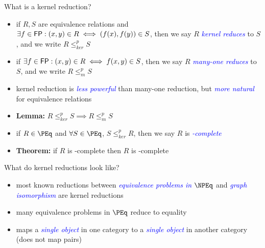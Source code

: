 \documentclass[final]{beamer}
\newcommand{\emphblue}[1]{\emph{\textcolor{blue}{#1}}}
\newcommand{\kr}{\leq_{ker}^p}
\newcommand{\mor}{\leq_{m}^p}
\begin{document}
\begin{frame}{}
\begin{columns}[t]
    \begin{column}{.3\linewidth}
      \begin{block}{\LARGE What is a kernel reduction?}
        \begin{itemize}\Large
        \item if $R,S$ are equivalence relations and $\exists f\in{\ensuremath{\mathsf{FP}}}: (x,y)\in
          R\iff(f(x),f(y))\in S$, then we say $R$ \emphblue{kernel reduces} to
          $S$, and we write $R\kr S$
        \item if $\exists f\in{\ensuremath{\mathsf{FP}}}: (x,y)\in R\iff f(x,y)\in S$, then we say $R$
          \emphblue{many-one reduces} to $S$, and we write $R\mor S$
        \item kernel reduction is \emphblue{less powerful} than many-one
          reduction, but \emphblue{more natural} for equivalence relations
        \item \textbf{Lemma:} $R\kr S\implies R\mor S$
        \item if $R\in\PEq$ and $\forall S\in\PEq$, $S\kr R$, then we say $R$
          is \emphblue{\PEq-complete}
        \item \textbf{Theorem:} if $R$ is \NPEq-complete then $R$ is
          \NP-complete
        \end{itemize}
      \end{block}

      \begin{block}{\LARGE What do kernel reductions look like?}
        \begin{itemize}\Large
        \item most known reductions between \emphblue{equivalence problems in
          $\NPEq$} and \emphblue{graph isomorphism} are kernel reductions
        \item many equivalence problems in $\PEq$ reduce to equality
        \item maps a \emphblue{single object} in one category to a
          \emphblue{single object} in another category (does not map pairs)
        \end{itemize}
      \end{block}


\end{column}
\end{columns}
\end{frame}
\end{document}
